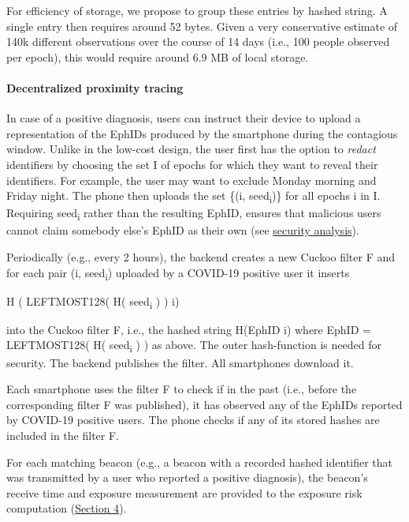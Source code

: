 \documentclass{article}
\begin{document}
For efficiency of storage, we propose to group these entries by hashed
string. A single entry then requires around 52 bytes. Given a very
conservative estimate of 140k different observations over the course of
14 days (i.e., 100 people observed per epoch), this would require around
6.9 MB of local storage.

\hypertarget{decentralized-proximity-tracing-2}{%
\paragraph{Decentralized proximity
tracing}\label{decentralized-proximity-tracing-2}}

In case of a positive diagnosis, users can instruct their device to
upload a representation of the EphIDs produced by the smartphone during
the contagious window. Unlike in the low-cost design, the user first has
the option to \emph{redact} identifiers by choosing the set I of epochs
for which they want to reveal their identifiers. For example, the user
may want to exclude Monday morning and Friday night. The phone then
uploads the set \{(i, seed\textsubscript{i})\} for all epochs i in I.
Requiring seed\textsubscript{i} rather than the resulting EphID, ensures
that malicious users cannot claim somebody else's EphID as their own
(see
\protect\hyperlink{security-analysis-of-unlinkable-design}{{security
analysis}}).

Periodically (e.g., every 2 hours), the backend creates a new Cuckoo
filter F and for each pair (i, seed\textsubscript{i}) uploaded by a
COVID-19 positive user it inserts

H ( LEFTMOST128( H( seed\textsubscript{i} ) ) \textbar\textbar{} i)

into the Cuckoo filter F, i.e., the hashed string H(EphID
\textbar\textbar{} i) where EphID = LEFTMOST128( H(
seed\textsubscript{i} ) ) as above. The outer hash-function is needed
for security. The backend publishes the filter. All smartphones download
it.

Each smartphone uses the filter F to check if in the past (i.e., before
the corresponding filter F was published), it has observed any of the
EphIDs reported by COVID-19 positive users. The phone checks if any of
its stored hashes are included in the filter F.

For each matching beacon (e.g., a beacon with a recorded hashed
identifier that was transmitted by a user who reported a positive
diagnosis), the beacon's receive time and exposure measurement are
provided to the exposure risk computation
(\protect\hyperlink{exposure-estimation}{{Section 4}}).
\end{document}
